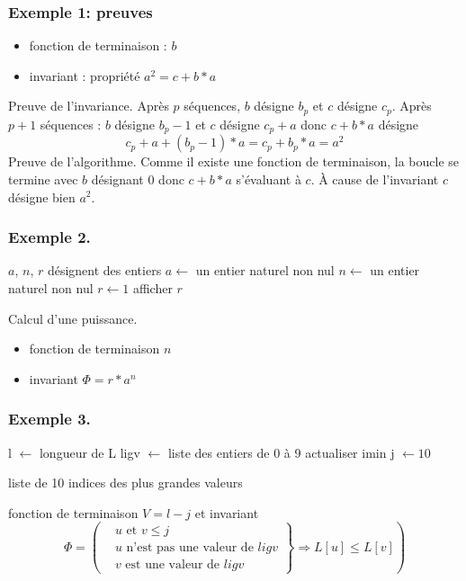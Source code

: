 \begin{frame}
  \frametitle{Exemple 1: preuves}
\begin{itemize}
  \item fonction de terminaison : $b$
  \item invariant : propriété $a^2 = c +b*a$
\end{itemize}
Preuve de l'invariance.\newline
Après $p$ séquences, $b$ désigne $b_p$ et $c$ désigne $c_p$.\newline
Après $p+1$ séquences : $b$ désigne $b_p-1$ et $c$ désigne $c_p+a$ donc $c+b*a$ désigne
  \begin{displaymath}
   c_p + a + (b_p-1)*a = c_p + b_p*a = a^2 
  \end{displaymath}
Preuve de l'algorithme.\newline
Comme il existe une fonction de terminaison, la boucle se termine avec $b$ désignant $0$ donc $c+b*a$ s'évaluant à $c$.
\`A cause de l'invariant $c$ désigne bien $a^2$.
\end{frame}

\begin{frame}
  \frametitle{Exemple 2.}
\begin{algorithm}[H]
  $a$, $n$, $r$ désignent des entiers\;
  $a\longleftarrow$ un entier naturel non nul\;
  $n\longleftarrow$ un entier naturel non nul\;
  $r\longleftarrow 1$\;
  afficher $r$\;
  \caption{Calcul d'une puissance.}
\end{algorithm}
\begin{itemize}
  \item fonction de terminaison $n$
  \item invariant $\Phi = r * a^n$
\end{itemize}
\end{frame}

\begin{frame}
  \frametitle{Exemple 3.}
\begin{algorithm}[H]
  l $\leftarrow$ longueur de L\;
  ligv $\leftarrow$ liste des entiers de 0 à 9\;
  actualiser  imin\;
  j $\leftarrow 10$\;
  \caption{liste de 10 indices des plus grandes valeurs}
\end{algorithm}
fonction de terminaison $V = l-j$ et invariant
\begin{displaymath}
  \Phi = 
\left( 
\left. 
\begin{aligned}
  &u \text{ et } v \leq j\\
  &u \text{ n'est pas une valeur de }ligv \\
  &v \text{ est une valeur de }ligv 
\end{aligned}
\right\rbrace 
\Rightarrow L[u] \leq L[v]
\right) 
\end{displaymath}
\end{frame}

